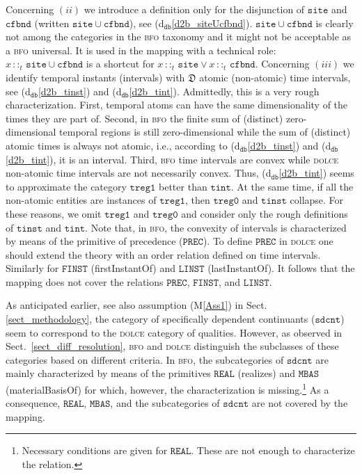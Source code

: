 \documentclass[ao]{iosart2x}
\newcommand{\nb}[1]{\textcolor{red}{$|$}\marginpar{\hspace*{-0cm}\parbox{20mm}{\scriptsize\raggedright\textcolor{red}{#1}}}}
\newcommand{\dbDefLabel}{\textrm{d$_\texttt{db}$}}
\newcommand{\refdbdf}[1]{({\dbDefLabel}\ref{#1})}
\newcommand{\pr}[1]{\mathtt{#1}}
\newcommand{\cn}[1]{\mathtt{#1}}
\newcommand{\dolce}{{\textsc{dolce}}}
\newcommand{\bfo}{{\textsc{bfo}}}
\newcommand {\thdolce} {\ensuremath{\mathfrak{D}}}
\newcommand{\sdcntbcat}{\cn{sdcnt}}
\newcommand{\sitebcat}{\cn{site}}
\newcommand{\cfbndbcat}{\cn{cfbnd}}
\newcommand{\tinstbcat}{\cn{tinst}}
\newcommand{\tintbcat}{\cn{tint}}
\newcommand{\onetregbcat}{\cn{treg1}}
\newcommand{\zerotregbcat}{\cn{treg0}}
\newcommand{\bfoiof}[1]{{\,::_{#1\:\!}}}
\newcommand{\bforealizes}{\pr{REAL}}
\begin{document}
Concerning $(ii)$ we introduce a definition only for the disjunction of $\sitebcat$ and $\cfbndbcat$ (written $\sitebcat{\cup}\cfbndbcat$), see \refdbdf{d2b_siteUcfbnd}. $\sitebcat{\cup}\cfbndbcat$ is clearly not among the categories in the {\bfo} taxonomy and it might not be acceptable as a {\bfo} universal. It is used in the mapping with a technical role: $x \bfoiof{t} \sitebcat{\cup}\cfbndbcat$ is a shortcut for $x \bfoiof{t} \sitebcat \lor x \bfoiof{t}\cfbndbcat$. %
Concerning $(iii)$ we identify temporal instants (intervals) with $\thdolce$ atomic (non-atomic) time intervals, see \refdbdf{d2b_tinst} and \refdbdf{d2b_tint}. Admittedly, this is a very rough characterization. First, temporal atoms can have the same dimensionality of the times they are part of. Second, in {\bfo} the finite sum of (distinct) zero-dimensional temporal regions is still zero-dimensional while the sum of (distinct) atomic times is always not atomic, i.e., according to \refdbdf{d2b_tinst} and \refdbdf{d2b_tint}, {it is} an interval. Third, {\bfo} time intervals are convex while {\dolce} non-atomic time intervals are not necessarily convex. Thus, \refdbdf{d2b_tint} seems to approximate the category $\onetregbcat$ better than $\tintbcat$. At the same time, if all the non-atomic entities are instances of  $\onetregbcat$, then $\zerotregbcat$ and $\tinstbcat$ collapse. For these reasons, we omit $\onetregbcat$ and $\zerotregbcat$ and 
consider only the rough definitions of $\tinstbcat$ and $\tintbcat$. Note that, in {\bfo}, the convexity of intervals is characterized by means of the primitive of precedence ($\pr{PREC}$). To define $\pr{PREC}$ in {\dolce} one should extend the theory with an order relation defined on time intervals. Similarly for $\pr{FINST}$ (firstInstantOf) and $\pr{LINST}$ (lastInstantOf). It follows that the mapping does not cover the relations $\pr{PREC}$, $\pr{FINST}$, and $\pr{LINST}$.

As anticipated earlier, see also assumption (M\ref{Ass1}) in Sect. \ref{sect_methodology}, the category of specifically dependent continuants ($\sdcntbcat$) seem to correspond to the {\dolce} category of qualities. However, as observed in Sect.~\ref{sect_diff_resolution}, {\bfo} and {\dolce} distinguish the subclasses of these categories based on different criteria. In {\bfo}, the subcategories of $\sdcntbcat$ are mainly characterized by means of the primitives $\bforealizes$ (realizes) and $\pr{MBAS}$ (materialBasisOf) for which, however, the characterization is missing.\footnote{Necessary conditions are given for $\bforealizes$. These are not enough to characterize the relation.} As a consequence, $\bforealizes$, $\pr{MBAS}$, and the subcategories of $\sdcntbcat$ are not covered by the mapping.
\end{document}
